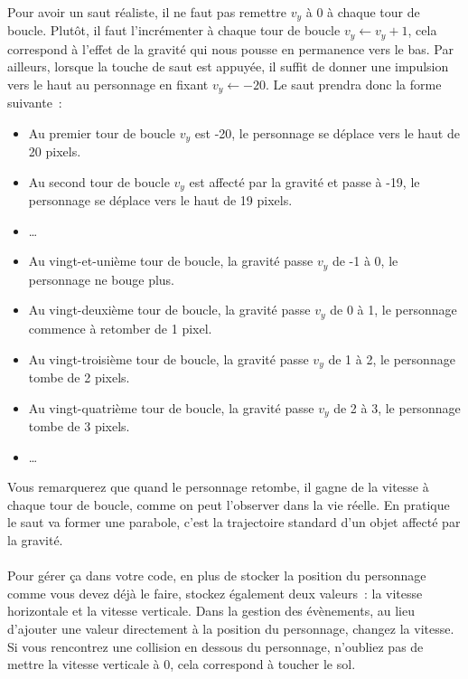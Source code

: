 \paragraph{}
Pour avoir un saut réaliste, il ne faut pas remettre \(v_y\) à 0 à chaque tour de boucle.
Plutôt, il faut l'incrémenter à chaque tour de boucle \(v_y \gets v_y + 1\), cela correspond à l'effet de la gravité qui nous pousse en permanence vers le bas.
Par ailleurs, lorsque la touche de saut est appuyée, il suffit de donner une impulsion vers le haut au personnage en fixant \(v_y \gets -20\).
Le saut prendra donc la forme suivante~:
\begin{itemize}
	\item Au premier tour de boucle \(v_y\) est -20, le personnage se déplace vers le haut de 20 pixels.
	\item Au second tour de boucle \(v_y\) est affecté par la gravité et passe à -19, le personnage se déplace vers le haut de 19 pixels.
	\item …
	\item Au vingt-et-unième tour de boucle, la gravité passe \(v_y\) de -1 à 0, le personnage ne bouge plus.
	\item Au vingt-deuxième tour de boucle, la gravité passe \(v_y\) de 0 à 1, le personnage commence à retomber de 1 pixel.
	\item Au vingt-troisième tour de boucle, la gravité passe \(v_y\) de 1 à 2, le personnage tombe de 2 pixels.
	\item Au vingt-quatrième tour de boucle, la gravité passe \(v_y\) de 2 à 3, le personnage tombe de 3 pixels.
	\item …
\end{itemize}
Vous remarquerez que quand le personnage retombe, il gagne de la vitesse à chaque tour de boucle, comme on peut l'observer dans la vie réelle.
En pratique le saut va former une parabole, c'est la trajectoire standard d'un objet affecté par la gravité.

\paragraph{}
Pour gérer ça dans votre code, en plus de stocker la position du personnage comme vous devez déjà le faire, stockez également deux valeurs~: la vitesse horizontale et la vitesse verticale.
Dans la gestion des évènements, au lieu d'ajouter une valeur directement à la position du personnage, changez la vitesse.
Si vous rencontrez une collision en dessous du personnage, n'oubliez pas de mettre la vitesse verticale à 0, cela correspond à toucher le sol.

